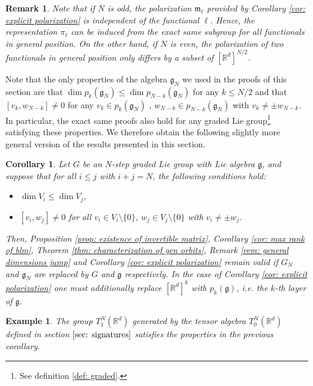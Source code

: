 \documentclass[pdflatex,sn-mathphys-num]{sn-jnl}
\theoremstyle{thmstyletwo}
\theoremstyle{thmstyleone}
\newtheorem{corollary}[definition]{Corollary}
\theoremstyle{thmstyletwo}
\newtheorem{example}[definition]{Example}
\newtheorem{remark}[definition]{Remark}
\newcommand{\fancyg}{\mathfrak{g}}
\newcommand{\fancym}{\mathfrak{m}}
\newcommand{\rdbracket}{[\mathbb{R}^d]}
\newcommand{\R}{\mathbb{R}}
\begin{document}
	\begin{remark}
		Note that if $N$ is odd, the polarization $\fancym_{\ell}$ provided by Corollary \ref{cor: explicit polarization} is independent of the functional $\ell$. Hence, the representation $\pi_{\ell}$ can be induced from the exact same subgroup for all functionals in general position. On the other hand, if $N$ is even, the polarization of two functionals in general position only differs by a subset of $\rdbracket^{N/2}$.
	\end{remark}
	Note that the only properties of the algebra $\fancyg_N$ we used in the proofs of this section are that $\dim p_k(\fancyg_N) \leq \dim p_{N-k}(\fancyg_N)$ for any $k \leq N/2$ and that $[v_k,w_{N-k}] \neq 0$ for any $v_k \in p_k(\fancyg_N)$ , $w_{N-k} \in p_{N-k}(\fancyg_N)$ with $v_k \neq \pm w_{N-k}$. In particular, the exact same proofs also hold for any graded Lie group\footnote{See definition \ref{def: graded}.} satisfying these properties. We therefore obtain the following slightly more general version of the results presented in this section.
	\begin{corollary}\label{cor: generalization of results 1}
		Let \( G \) be an \( N \)-step graded Lie group with Lie algebra \( \fancyg \), and suppose that for all \( i \leq j \) with \( i + j = N \), the following conditions hold:
		\begin{itemize}
			\item[i)] \( \dim V_i \leq \dim V_j \),
			\item[ii)] \( [v_i, w_j] \neq 0 \) for all \( v_i \in V_i \setminus \{0\} \), \( w_j \in V_j \setminus \{0\} \) with \( v_i \neq \pm w_j \).
		\end{itemize}
		Then, Proposition \ref{prop: existence of invertible matrix}, Corollary \ref{cor: max rank of blm}, Theorem \ref{thm: characterization of gen orbits}, Remark \ref{rem: general dimensions jump} and Corollary \ref{cor: explicit polarization}  remain valid if $G_N$ and $\fancyg_N$ are replaced by $G$ and $\fancyg$ respectively. In the case of Corollary \ref{cor: explicit polarization} one must additionally replace $\rdbracket^k$ with $p_k(\fancyg)$, i.e. the $k$-th layer of $\fancyg$.
	\end{corollary}
	\begin{example}
		The group $T_1^N\left(\R^d\right)$ generated by the tensor algebra $T_0^N\left(\R^d\right)$ defined in section $\ref{sec: signatures}$ satisfies the properties in the previous corollary.
	\end{example}
	\newpage
\end{document}
